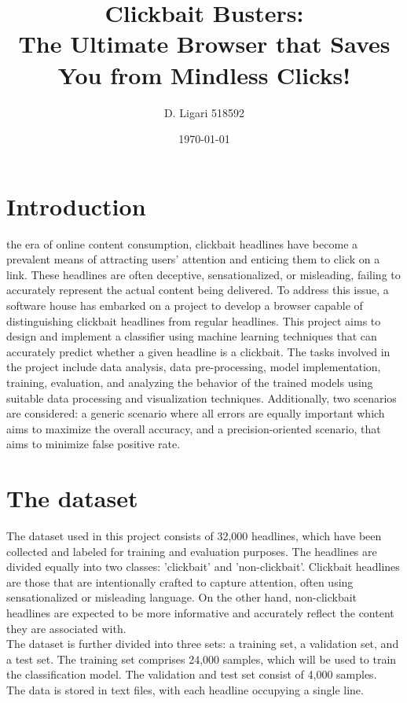 \documentclass{class}
\title{Clickbait Busters:\\ The Ultimate Browser that Saves You from Mindless Clicks!}
\author[1]{D. Ligari 518592}
\affil[1]{Machine Learning course, University of Pavia, Department of Computer Engineering (Data Science), Pavia, Italy}
\date{\today}
\begin{document}
\maketitle
\thispagestyle{FirstPage}
\tableofcontents
\section{Introduction}
the era of online content consumption, clickbait headlines have become a prevalent means of attracting users' attention and enticing them to click on a link.
These headlines are often deceptive, sensationalized, or misleading, failing to accurately represent the actual content being delivered.
To address this issue, a software house has embarked on a project to develop a browser capable of distinguishing clickbait headlines from regular headlines.
This project aims to design and implement a classifier using machine learning techniques that can accurately predict whether a given headline is a clickbait.
The tasks involved in the project include data analysis, data pre-processing, model implementation, training, evaluation, and analyzing the behavior
of the trained models using suitable data processing and visualization techniques.
Additionally, two scenarios are considered: a generic scenario where all errors are equally important which aims to maximize the overall accuracy,
and a precision-oriented scenario, that aims to minimize false positive rate.

\section{The dataset}
The dataset used in this project consists of 32,000 headlines, which have been collected and labeled for training and evaluation purposes.
The headlines are divided equally into two classes: 'clickbait' and 'non-clickbait'.
Clickbait headlines are those that are intentionally crafted to capture attention,
often using sensationalized or misleading language.
On the other hand, non-clickbait headlines are expected to be more informative and accurately reflect the content they are associated with.\\
The dataset is further divided into three sets: a training set, a validation set, and a test set.
The training set comprises 24,000 samples, which will be used to train the classification model. The validation and test set consist of 4,000 samples.\\
The data is stored in text files, with each headline occupying a single line.
\pagestyle{OtherPage}
\end{document}
